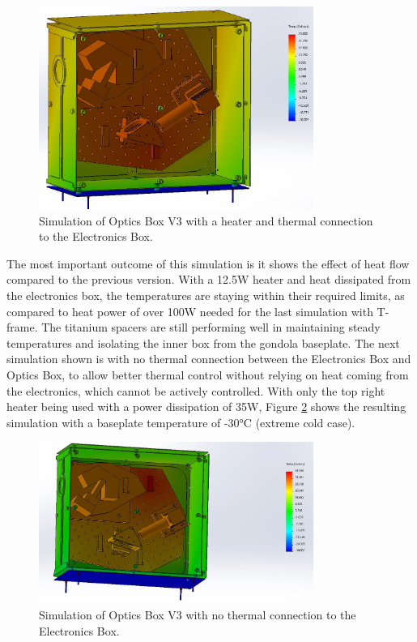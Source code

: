 \begin{figure}
    \centering
    \includegraphics[width=0.8\textwidth]{chap3_images/LIFE_V3_images/TA_-20_deg_20_deg_12W_heater.JPG}
    \caption{Simulation of Optics Box V3 with a heater and thermal connection to the Electronics Box.}
    \label{fig:OB_V3_TA_1}
\end{figure}

The most important outcome of this simulation is it shows the effect of heat flow compared to the previous version. With a 12.5W heater and heat dissipated from the electronics box, the temperatures are staying within their required limits, as compared to heat power of over 100W needed for the last simulation with T-frame. The titanium spacers are still performing well in maintaining steady temperatures and isolating the inner box from the gondola baseplate. The next simulation shown is with no thermal connection between the Electronics Box and Optics Box, to allow better thermal control without relying on heat coming from the electronics, which cannot be actively controlled. With only the top right heater being used with a power dissipation of 35W, Figure \ref{fig:OB_V3_TA_2} shows the resulting simulation with a baseplate temperature of -30°C (extreme cold case).

\begin{figure}
    \centering
    \includegraphics[width=0.8\textwidth]{chap3_images/LIFE_V3_images/TA_-30_deg_35W_heater.JPG}
    \caption{Simulation of Optics Box V3 with no thermal connection to the Electronics Box.}
    \label{fig:OB_V3_TA_2}
\end{figure}

